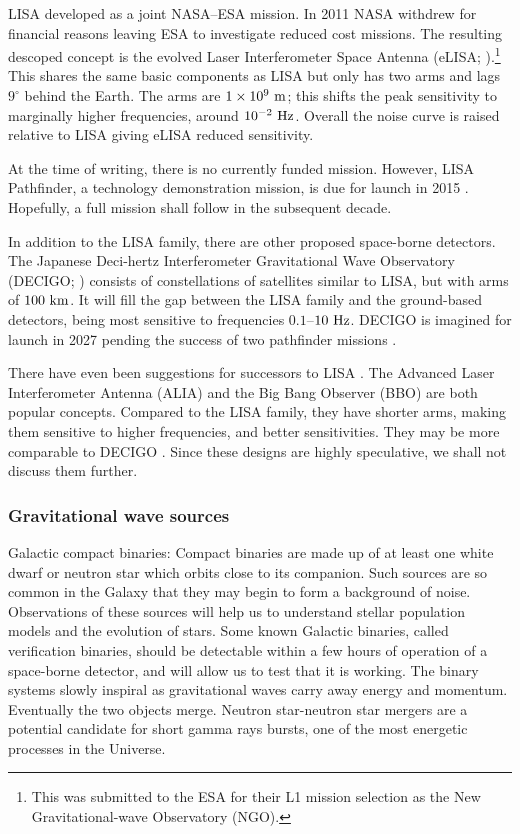 LISA developed as a joint NASA--ESA mission. In 2011 NASA withdrew for financial reasons leaving ESA to investigate reduced cost missions. The resulting descoped concept is the evolved Laser Interferometer Space Antenna (eLISA; \citealt{Jennrich2011, Amaro-Seoane2012a}).\footnote{This was submitted to the ESA for their L1 mission selection as the New Gravitational-wave Observatory (NGO).} This shares the same basic components as LISA but only has two arms and lags $9^{\circ}$ behind the Earth. The arms are $1 \times 10^9~\mathrm{m}$; this shifts the peak sensitivity to marginally higher frequencies, around $10^{-2}~\mathrm{Hz}$. Overall the noise curve is raised relative to LISA giving eLISA reduced sensitivity.

At the time of writing, there is no currently funded mission. However, LISA Pathfinder, a technology demonstration mission, is due for launch in 2015 \citep{Anza2005, Antonucci2012}. Hopefully, a full mission shall follow in the subsequent decade.

In addition to the LISA family, there are other proposed space-borne detectors. The Japanese Deci-hertz Interferometer Gravitational Wave Observatory (DECIGO; \citealt{Kawamura2006,Kawamura2011}) consists of constellations of satellites similar to LISA, but with arms of $100~\mathrm{km}$. It will fill the gap between the LISA family and the ground-based detectors, being most sensitive to frequencies $0.1$--$10~\mathrm{Hz}$. DECIGO is imagined for launch in 2027 pending the success of two pathfinder missions \citep{Ando2010}.

There have even been suggestions for successors to LISA \citep{Crowder2005}. The Advanced Laser Interferometer Antenna (ALIA) and the Big Bang Observer (BBO) are both popular concepts. Compared to the LISA family, they have shorter arms, making them sensitive to higher frequencies, and better sensitivities. They may be more comparable to DECIGO \citet{Yagi2011a}. Since these designs are highly speculative, we shall not discuss them further.

\subsubsection{Gravitational wave sources}



Galactic compact binaries: Compact binaries are made up of at least one white dwarf or neutron star which orbits close to its companion. Such sources are so common in the Galaxy that they may begin to form a background of noise. Observations of these sources will help us to understand stellar population models and the evolution of stars. Some known Galactic binaries, called verification binaries, should be detectable within a few hours of operation of a space-borne detector, and will allow us to test that it is working. The binary systems slowly inspiral as gravitational waves carry away energy and momentum. Eventually the two objects merge. Neutron star-neutron star mergers are a potential candidate for short gamma rays bursts, one of the most energetic processes in the Universe.

